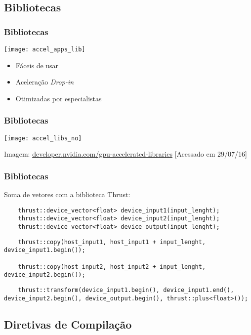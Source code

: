 \documentclass[10pt, compress, aspectratio=43, xcolor={table,usenames,dvipsnames}]{beamer}
\begin{document}
\subsection{Bibliotecas}

\begin{frame}
    \frametitle{Bibliotecas}
    \begin{center}
        \texttt{[image: accel\_apps\_lib]}
    \end{center}

    \begin{itemize}
        \item Fáceis de usar
        \item Aceleração \textit{Drop-in}
        \item Otimizadas por especialistas
    \end{itemize}
\end{frame}

\begin{frame}
    \frametitle{Bibliotecas}
    \centering
    \texttt{[image: accel\_libs\_no]}
    \vfill

    \tiny{Imagem: \url{developer.nvidia.com/gpu-accelerated-libraries} [Acessado em 29/07/16]}
\end{frame}

\begin{frame}[fragile]
    \frametitle{Bibliotecas}
    Soma de vetores com a biblioteca \alert{Thrust}:
    \begin{verbatim}
    thrust::device_vector<float> device_input1(input_lenght);
    thrust::device_vector<float> device_input2(input_lenght);
    thrust::device_vector<float> device_output(input_lenght);
    \end{verbatim}

    \begin{verbatim}
    thrust::copy(host_input1, host_input1 + input_lenght, device_input1.begin());

    thrust::copy(host_input2, host_input2 + input_lenght, device_input2.begin());
    \end{verbatim}

    \begin{verbatim}
    thrust::transform(device_input1.begin(), device_input1.end(), device_input2.begin(), device_output.begin(), thrust::plus<float>());
    \end{verbatim}
\end{frame}

\subsection{Diretivas de Compilação}
\end{document}
